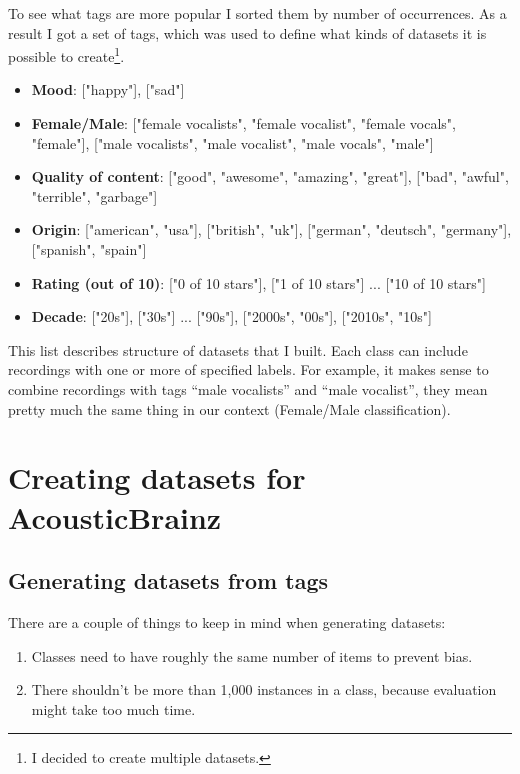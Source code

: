 \documentclass{scrartcl}
\begin{document}
To see what tags are more popular I sorted them by number of occurrences. As a result I got a set of tags, which was used to define what kinds of datasets it is possible to create\footnote{I decided to create multiple datasets.}.

\begin{itemize}
    \item \textbf{Mood}: ["happy"], ["sad"]
    \item \textbf{Female/Male}: ["female vocalists", "female vocalist", "female vocals",
"female"], ["male vocalists", "male vocalist", "male vocals", "male"]
    \item \textbf{Quality of content}: ["good", "awesome", "amazing", "great"], ["bad",
"awful", "terrible", "garbage"]
    \item \textbf{Origin}: ["american", "usa"], ["british", "uk"], ["german", "deutsch",
"germany"], ["spanish", "spain"]
    \item \textbf{Rating (out of 10)}: ["0 of 10 stars"], ["1 of 10 stars"] ... ["10 of 10 stars"]
    \item \textbf{Decade}: ["20s"], ["30s"] ... ["90s"], ["2000s", "00s"], ["2010s", "10s"]
\end{itemize}

This list describes structure of datasets that I built. Each class can include recordings with one or more of specified labels. For example, it makes sense to combine recordings with tags ``male vocalists'' and ``male vocalist'', they mean pretty much the same thing in our context (Female/Male classification).


\section{Creating datasets for AcousticBrainz}

\subsection{Generating datasets from tags}

There are a couple of things to keep in mind when generating datasets:
\begin{enumerate}
    \item Classes need to have roughly the same number of items to prevent bias.
    \item There shouldn't be more than 1,000 instances in a class, because evaluation might take too much time.
\end{enumerate}
\end{document}
